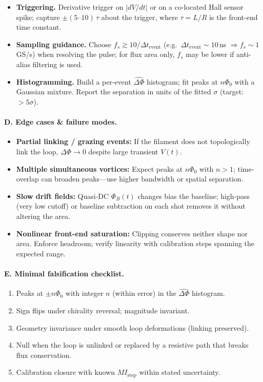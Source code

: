 \documentclass[12pt]{article}
\begin{document}
\begin{itemize}
        \item \textbf{Triggering.} Derivative trigger on $|dV/dt|$ or on a co-located Hall sensor spike; capture $\pm(5\text{–}10)\,\tau$ about the trigger, where $\tau=L/R$ is the front-end time constant.
        \item \textbf{Sampling guidance.} Choose $f_s\gtrsim 10/\Delta t_\text{event}$ (e.g.\ $\Delta t_\text{event}\!\sim\!10$\,ns $\Rightarrow f_s\!\sim\!1$\,GS/s) when resolving the pulse; for flux area only, $f_s$ may be lower if anti-alias filtering is used.
        \item \textbf{Histogramming.} Build a per-event $\widehat{\Delta\Phi}$ histogram; fit peaks at $n\Phi_0$ with a Gaussian mixture. Report the separation in units of the fitted $\sigma$ (target: $>\!5\sigma$).
        \end{itemize}

    \paragraph{D. Edge cases \& failure modes.}
        \begin{itemize}
        \item \textbf{Partial linking / grazing events:} If the filament does not topologically link the loop, $\Delta\Phi\to 0$ despite large transient $V(t)$.
        \item \textbf{Multiple simultaneous vortices:} Expect peaks at $n\Phi_0$ with $n>1$; time-overlap can broaden peaks—use higher bandwidth or spatial separation.
        \item \textbf{Slow drift fields:} Quasi-DC $\Phi_B(t)$ changes bias the baseline; high-pass (very low cutoff) or baseline subtraction on each shot removes it without altering the area.
        \item \textbf{Nonlinear front-end saturation:} Clipping conserves neither shape nor area. Enforce headroom; verify linearity with calibration steps spanning the expected range.
        \end{itemize}

    \paragraph{E. Minimal falsification checklist.}
        \begin{enumerate}
        \item Peaks at $\pm n\Phi_0$ with integer $n$ (within error) in the $\widehat{\Delta\Phi}$ histogram.
        \item Sign flips under chirality reversal; magnitude invariant.
        \item Geometry invariance under smooth loop deformations (linking preserved).
        \item Null when the loop is unlinked or replaced by a resistive path that breaks flux conservation.
        \item Calibration closure with known $M I_\text{step}$ within stated uncertainty.
        \end{enumerate}
\end{document}
